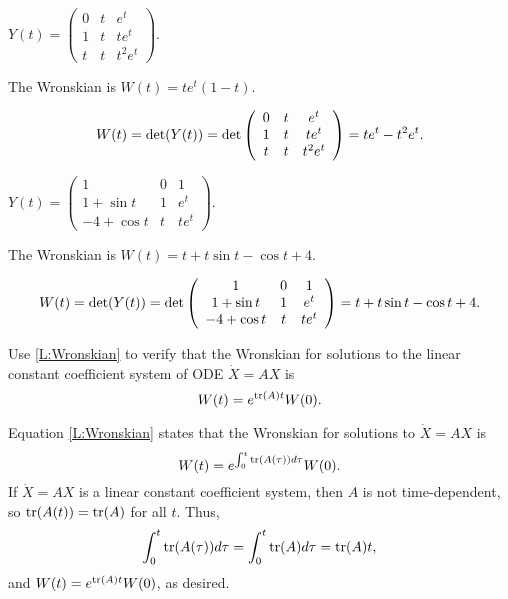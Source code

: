 \documentclass{ximera}
\begin{document}
\begin{exercise} \label{c14.4.1c}
$Y(t) = \left(\begin{array}{ccc}
0 & t & e^t\\  1 & t & te^t \\ t & t & t^2 e^t \end{array}\right)$.

\begin{solution}
\ans The Wronskian is $W(t) = te^t(1 - t)$.

\soln
\[
W(t) = \det(Y(t)) = \det\left(\begin{array}{ccc} 0 & t & e^t \\ 1 & t & te^t \\ t & t & t^2e^t\end{array}\right)
= te^t - t^2e^t.
\]

\end{solution}
\end{exercise}

\begin{exercise} \label{c14.4.1d}
$Y(t) = \left(\begin{array}{ccc}
1 & 0 & 1\\  1 + \sin t & 1 & e^t \\ -4 + \cos t & t & te^t 
\end{array}\right)$.

\begin{solution}
\ans The Wronskian is $W(t) = t + t\sin t - \cos t + 4$.

\soln
\[
W(t) = \det(Y(t)) =
\det\left(\begin{array}{ccc} 1 & 0 & 1 \\ 1 + \sin t & 1 & e^t \\ -4 + \cos t & t & te^t\end{array}\right) =
t + t\sin t - \cos t + 4.
\]

\end{solution}
\end{exercise}

\begin{exercise}  \label{c14.w.2}
Use \eqref{L:Wronskian} to verify that the Wronskian for solutions to the linear 
constant coefficient system of ODE $\dot{X}=AX$ is
\begin{equation}  \label{E:ccw}
W(t) = e^{{\rm tr}(A)t}W(0).
\end{equation}

\begin{solution}
Equation \eqref{L:Wronskian}
states that the Wronskian for solutions to $\dot{X} = AX$ is
\[
W(t) = e^{\int_0^t{\rm tr}(A(\tau))d\tau}W(0).
\]
If $\dot{X} = AX$ is a linear constant coefficient system, then $A$ is not
time-dependent, so ${\rm tr}(A(t)) = {\rm tr}(A)$ for all $t$.  Thus,
\[
\int_0^t{\rm tr}(A(\tau))d\tau = \int_0^t{\rm tr}(A)d\tau = {\rm tr}(A)t,
\]
and $W(t) = e^{{\rm tr}(A)t}W(0)$, as desired.

\end{solution}
\end{exercise}
\end{document}
